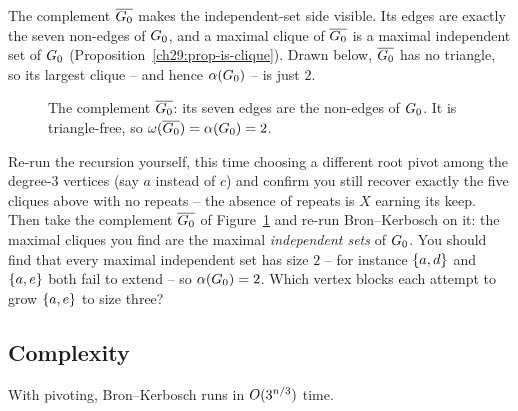 The complement $\overline{G_0}$ makes the independent-set side visible. Its
edges are exactly the seven non-edges of $G_0$, and a maximal clique of
$\overline{G_0}$ is a maximal independent set of $G_0$
(Proposition~\ref{ch29:prop-is-clique}). Drawn below, $\overline{G_0}$ has no
triangle, so its largest clique -- and hence $\alpha(G_0)$ -- is just $2$.

\begin{figure}[H]
\centering
{}
\caption{The complement $\overline{G_0}$: its seven edges are the non-edges of
$G_0$. It is triangle-free, so $\omega(\overline{G_0})=\alpha(G_0)=2$.}
\label{ch29:fig-complement}
\end{figure}

\begin{labbox}
Re-run the recursion yourself, this time choosing a different root pivot among the
degree-$3$ vertices (say $a$ instead of $c$) and confirm you still recover exactly
the five cliques above with no repeats -- the absence
of repeats is $X$ earning its keep. Then take the complement
$\overline{G_0}$ of Figure~\ref{ch29:fig-complement} and re-run Bron--Kerbosch
on it: the maximal cliques you find are the maximal
\emph{independent sets} of $G_0$. You should find that every maximal
independent set has size $2$ -- for instance $\{a,d\}$ and $\{a,e\}$ both fail
to extend -- so $\alpha(G_0)=2$. Which vertex blocks each attempt to grow
$\{a,e\}$ to size three?
\end{labbox}

\subsection{Complexity}

\begin{theorem}
\label{ch29:thm-bk-time}
With pivoting, Bron--Kerbosch runs in $O(3^{n/3})$ time.
\end{theorem}

